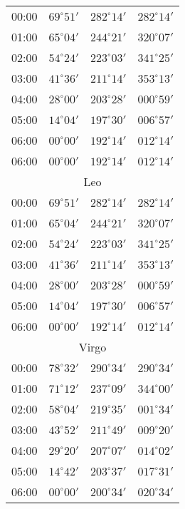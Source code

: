 \begin{table}
\begin{Parallel}{}{}
{{\begin{tabular}{l|lll}
00:00 & $69^\circ 51'$ & $282^\circ 14'$& $282^\circ 14'$ \\
01:00 & $65^\circ 04'$ & $244^\circ 21'$& $320^\circ 07'$ \\
02:00 & $54^\circ 24'$ & $223^\circ 03'$& $341^\circ 25'$ \\
03:00 & $41^\circ 36'$ & $211^\circ 14'$& $353^\circ 13'$ \\
04:00 & $28^\circ 00'$ & $203^\circ 28'$& $000^\circ 59'$ \\
05:00 & $14^\circ 04'$ & $197^\circ 30'$& $006^\circ 57'$ \\
06:00 & $00^\circ 00'$ & $192^\circ 14'$& $012^\circ 14'$ \\
06:00 & $00^\circ 00'$ & $192^\circ 14'$& $012^\circ 14'$ \\
\multicolumn{4}{c}{Leo}\\
00:00 & $69^\circ 51'$ & $282^\circ 14'$& $282^\circ 14'$ \\
01:00 & $65^\circ 04'$ & $244^\circ 21'$& $320^\circ 07'$ \\
02:00 & $54^\circ 24'$ & $223^\circ 03'$& $341^\circ 25'$ \\
03:00 & $41^\circ 36'$ & $211^\circ 14'$& $353^\circ 13'$ \\
04:00 & $28^\circ 00'$ & $203^\circ 28'$& $000^\circ 59'$ \\
05:00 & $14^\circ 04'$ & $197^\circ 30'$& $006^\circ 57'$ \\
06:00 & $00^\circ 00'$ & $192^\circ 14'$& $012^\circ 14'$ \\
\multicolumn{4}{c}{Virgo}\\
00:00 & $78^\circ 32'$ & $290^\circ 34'$& $290^\circ 34'$ \\
01:00 & $71^\circ 12'$ & $237^\circ 09'$& $344^\circ 00'$ \\
02:00 & $58^\circ 04'$ & $219^\circ 35'$& $001^\circ 34'$ \\
03:00 & $43^\circ 52'$ & $211^\circ 49'$& $009^\circ 20'$ \\
04:00 & $29^\circ 20'$ & $207^\circ 07'$& $014^\circ 02'$ \\
05:00 & $14^\circ 42'$ & $203^\circ 37'$& $017^\circ 31'$ \\
06:00 & $00^\circ 00'$ & $200^\circ 34'$& $020^\circ 34'$ \\
\end{tabular}
}}
\end{Parallel}
\end{table}
